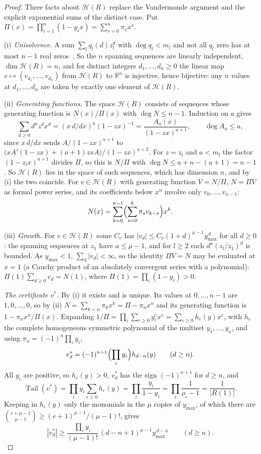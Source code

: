 \documentclass[11pt]{article}
\theoremstyle{definition}
\theoremstyle{plain}
\newcommand{\R}{\mathbb R}
\DeclareMathOperator{\Tail}{Tail}
\begin{document}
\begin{proof}
Three facts about $\mathcal H(R)$ replace the Vandermonde argument and the
explicit exponential sums of the distinct case.  Put
$\Pi(x)=\prod_{i=1}^n(1-y_ix)=\sum_{s=0}^n\pi_sx^s$.

(i) \emph{Unisolvence.}  A sum $\sum_lq_l(d)z_l^d$ with $\deg q_l<m_l$ and
not all $q_l$ zero has at most $n-1$ real
zeros~\cite[Part~Five, Ch.~1]{polya-szego}.  So the $n$ spanning sequences
are linearly independent, $\dim\mathcal H(R)=n$, and for distinct integers
$d_1,\ldots,d_n\ge0$ the linear map $v\mapsto(v_{d_1},\ldots,v_{d_n})$ from
$\mathcal H(R)$ to $\R^n$ is injective, hence bijective: any $n$ values at
$d_1,\ldots,d_n$ are taken by exactly one element of $\mathcal H(R)$.

(ii) \emph{Generating functions.}  The space $\mathcal H(R)$ consists of sequences
whose generating function is $N(x)/\Pi(x)$ with $\deg N\le n-1$.  Induction
on $a$ gives
\[
  \sum_{d\ge0}d^az^dx^d=(x\,d/dx)^a(1-zx)^{-1}
  =\frac{A_a(x)}{(1-zx)^{a+1}},\qquad \deg A_a\le a,
\]
since $x\,d/dx$ sends $A/(1-zx)^{a+1}$ to
$\bigl(xA'(1-zx)+(a+1)zxA\bigr)/(1-zx)^{a+2}$.  For $z=z_l$ and $a<m_l$ the
factor $(1-z_lx)^{a+1}$ divides $\Pi$, so this is $N/\Pi$ with
$\deg N\le a+n-(a+1)=n-1$.  So $\mathcal H(R)$ lies in the space of such
sequences, which has dimension $n$, and by (i) the two coincide.  For
$v\in\mathcal H(R)$ with generating function $V=N/\Pi$, $N=\Pi V$ as formal
power series, and its coefficients below $x^n$ involve only
$v_0,\ldots,v_{n-1}$:
\[
  N(x)=\sum_{k=0}^{n-1}\Bigl(\sum_{s=0}^k\pi_sv_{k-s}\Bigr)x^k .
\]

(iii) \emph{Growth.}  For $v\in\mathcal H(R)$ some $C_v$ has
$|v_d|\le C_v(1+d)^{\mu-1}y_{\max}^{\,d}$ for all $d\ge0$: the spanning
sequences at $z_1$ have $a\le\mu-1$, and for $l\ge2$ each
$d^a(z_l/z_1)^d$ is bounded.  As $y_{\max}<1$, $\sum_d|v_d|<\infty$, so the
identity $\Pi V=N$ may be evaluated at $x=1$ (a Cauchy product of an
absolutely convergent series with a polynomial):
$\Pi(1)\sum_{d\ge0}v_d=N(1)$, where $\Pi(1)=\prod_i(1-y_i)>0$.

\emph{The certificate $v^*$.}  By (i) it exists and is unique.  Its values
at $0,\ldots,n-1$ are $1,0,\ldots,0$, so by (ii)
$N=\sum_{k<n}\pi_kx^k=\Pi-\pi_nx^n$ and its generating function is
$1-\pi_nx^n/\Pi(x)$.  Expanding
$1/\Pi=\prod_i\sum_{e\ge0}y_i^ex^e=\sum_{e\ge0}h_e(y)x^e$, with $h_e$ the
complete homogeneous symmetric polynomial of the multiset
$y_1,\ldots,y_n$, and using $\pi_n=(-1)^n\prod_iy_i$,
\[
  v^*_d=(-1)^{n+1}\Bigl(\prod_iy_i\Bigr)h_{d-n}(y)\qquad(d\ge n).
\]
All $y_i$ are positive, so $h_e(y)>0$, $v^*_d$ has the sign $(-1)^{n+1}$
for $d\ge n$, and
\[
  \Tail(v^*)=\prod_iy_i\sum_{e\ge0}h_e(y)
  =\prod_i\frac{y_i}{1-y_i}=\prod_i\frac1{\rho_i-1}=\frac1{|R(1)|}.
\]
Keeping in $h_e(y)$ only the monomials in the $\mu$ copies of $y_{\max}$, of
which there are $\binom{e+\mu-1}{\mu-1}\ge(e+1)^{\mu-1}/(\mu-1)!$, gives
\[
  |v^*_d|\ge\frac{\prod_iy_i}{(\mu-1)!}\,(d-n+1)^{\mu-1}y_{\max}^{\,d-n}
  \qquad(d\ge n).
\]


\end{proof}
\end{document}

